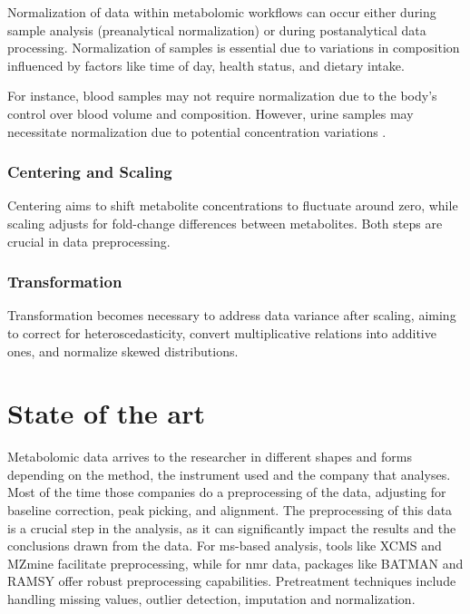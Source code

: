 \documentclass[ENG, BIB]{TFUOC}%
\begin{document}
Normalization of data within metabolomic workflows can occur either during sample analysis (preanalytical normalization) or during postanalytical data processing. Normalization of samples is essential due to variations in composition influenced by factors like time of day, health status, and dietary intake.

For instance, blood samples may not require normalization due to the body's control over blood volume and composition. However, urine samples may necessitate normalization due to potential concentration variations \cite{ulaszewskaNutrimetabolomicsIntegrativeAction2019a}.


\subsubsection{Centering and Scaling}

Centering aims to shift metabolite concentrations to fluctuate around zero, while scaling adjusts for fold-change differences between metabolites. Both steps are crucial in data preprocessing.

\subsubsection[Transf]{Transformation}

Transformation becomes necessary to address data variance after scaling, aiming to correct for heteroscedasticity, convert multiplicative relations into additive ones, and normalize skewed distributions.

\section{State of the art}


Metabolomic data arrives to the researcher in different shapes and forms depending on the method, the instrument used and the company that analyses. Most of the time those companies do a preprocessing of the data, adjusting for baseline correction, peak picking, and alignment. The preprocessing of this data is a crucial step in the analysis, as it can significantly impact the results and the conclusions drawn from the data.
For \gls{ms}-based analysis, tools like XCMS \cite{R-xcms} and MZmine \cite{schmidIntegrativeAnalysisMultimodal2023} facilitate preprocessing, while for \gls{nmr} data, packages like BATMAN \cite{R-batman} and RAMSY \cite{guRAMSYRatioAnalysis2013} offer robust preprocessing capabilities. Pretreatment techniques include handling missing values, outlier detection, imputation and normalization.
\end{document}
